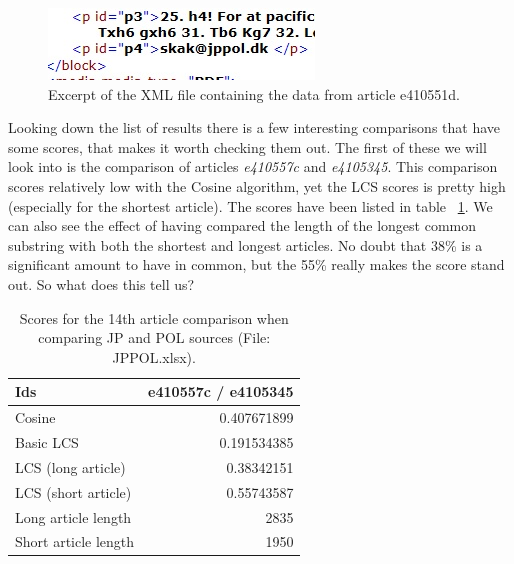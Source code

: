 \begin{figure}
	\centering
	\includegraphics[scale=1.0]{figures/XmlIssue4}
	\caption{Excerpt of the XML file containing the data from article e410551d.}
	\label{XmlIssue4}
\end{figure}

Looking down the list of results there is a few interesting comparisons that have some scores, that makes it worth checking them out. The first of these we will look into is the comparison of articles \textit{e410557c} and \textit{e4105345}. This comparison scores relatively low with the Cosine algorithm, yet the LCS scores is pretty high (especially for the shortest article). The scores have been listed in table ~\ref{JPPOLPartialMatch}. We can also see the effect of having compared the length of the longest common substring with both the shortest and longest articles. No doubt that 38\% is a significant amount to have in common, but the 55\% really makes the score stand out. So what does this tell us? 

\begin{table}
\begin{center}
	\begin{tabular}{l | r}
	Ids & e410557c / e4105345\\ \hline
	Cosine & 0.407671899\\ \hline
	Basic LCS & 0.191534385\\ \hline
	LCS (long article) & 0.38342151\\ \hline
	LCS (short article) & 0.55743587\\ \hline
	Long article length & 2835\\ \hline
	Short article length & 1950\\ \hline	
	\end{tabular}
\end{center}
\caption{Scores for the 14th article comparison when comparing JP and POL sources (File: JPPOL.xlsx).}
\label{JPPOLPartialMatch}
\end{table}

